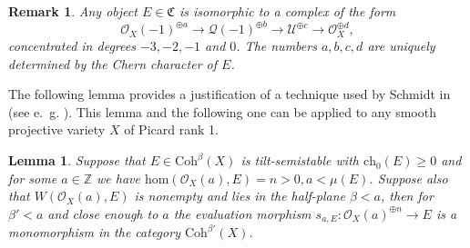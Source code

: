 \documentclass{amsart}
\newtheorem{lemma}[theorem]{Lemma}
\newtheorem{remark}[theorem]{Remark}
\begin{document}
	\begin{remark}\label{complexes}
		Any object $E\in\mathfrak C$ is isomorphic to a complex of the form
		$$\mathcal O_{X}(-1)^{\oplus a}\to\mathcal Q(-1)^{\oplus b}\to\mathcal U^{\oplus c}\to\mathcal O_{X}^{\oplus d},$$
		concentrated in degrees $-3,-2,-1$ and $0$. The numbers $a,b,c,d$ are uniquely determined by the Chern character of $E$.
	\end{remark}
	
	The following lemma provides a justification of a technique used by Schmidt in \cite{Sch23} (see e.~g. \cite[Lemma 6.9 (i)]{Sch23}). This lemma and the following one can be applied to any smooth projective variety $X$ of Picard rank 1.
	
	\begin{lemma}\label{subobject}Suppose that $E\in\mathrm{Coh}^\beta(X)$ is tilt-semistable with $\mathrm{ch}_0(E)\ge 0$ and for some $a\in\mathbb Z$ we have $\mathrm{hom}(\mathcal O_X(a),E)=n>0,a<\mu(E)$. Suppose also that $W(\mathcal O_X(a),E)$ is nonempty and lies in the half-plane $\beta<a$, then for $\beta'<a$ and close enough to $a$ the evaluation morphism $s_{a,E}:\mathcal O_X(a)^{\oplus n}\to E$ is a monomorphism in the category $\mathrm{Coh}^{\beta'}(X)$.\end{lemma}
	
\end{document}
